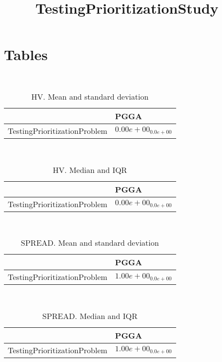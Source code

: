 \documentclass{article}
\title{TestingPrioritizationStudy}
\author{}
\begin{document}
\maketitle
\section{Tables}
\
\begin{table}
\caption{HV. Mean and standard deviation}
\label{table:mean.HV}
\centering
\begin{scriptsize}
\begin{tabular}{ll}
\hline &  PGGA\\
\hline
TestingPrioritizationProblem & $  0.00e+00_{ 0.0e+00}$ \\
\hline
\end{tabular}
\end{scriptsize}
\end{table}
\
\begin{table}
\caption{HV. Median and IQR}
\label{table:median.HV}
\begin{scriptsize}
\centering
\begin{tabular}{ll}
\hline &  PGGA\\
\hline
TestingPrioritizationProblem & $  0.00e+00_{ 0.0e+00}$ \\
\hline
\end{tabular}
\end{scriptsize}
\end{table}
\
\begin{table}
\caption{SPREAD. Mean and standard deviation}
\label{table:mean.SPREAD}
\centering
\begin{scriptsize}
\begin{tabular}{ll}
\hline &  PGGA\\
\hline
TestingPrioritizationProblem & \cellcolor{gray95}$  1.00e+00_{ 0.0e+00}$ \\
\hline
\end{tabular}
\end{scriptsize}
\end{table}
\
\begin{table}
\caption{SPREAD. Median and IQR}
\label{table:median.SPREAD}
\begin{scriptsize}
\centering
\begin{tabular}{ll}
\hline &  PGGA\\
\hline
TestingPrioritizationProblem & \cellcolor{gray95}$  1.00e+00_{ 0.0e+00}$ \\
\hline
\end{tabular}
\end{scriptsize}
\end{table}
\end{document}
